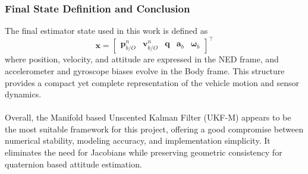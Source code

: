 \subsubsection{Final State Definition and Conclusion}
The final estimator state used in this work is defined as
$$
    \mathbf{x} =
    \begin{bmatrix}
        \mathbf{p}_{b/O}^{n} & \mathbf{v}_{b/O}^{n} & \mathbf{q} & \mathbf{a}_b & \mathbf{\omega}_b
    \end{bmatrix}^\top
$$
where position, velocity, and attitude are expressed in the NED frame, and accelerometer and gyroscope biases evolve in the Body frame. This structure provides a compact yet complete representation of the vehicle motion and sensor dynamics.  
\\ \\
Overall, the Manifold based Unscented Kalman Filter (UKF-M) appears to be the most suitable framework for this project, offering a good compromise between numerical stability, modeling accuracy, and implementation simplicity. It eliminates the need for Jacobians while preserving geometric consistency for quaternion based attitude estimation.
